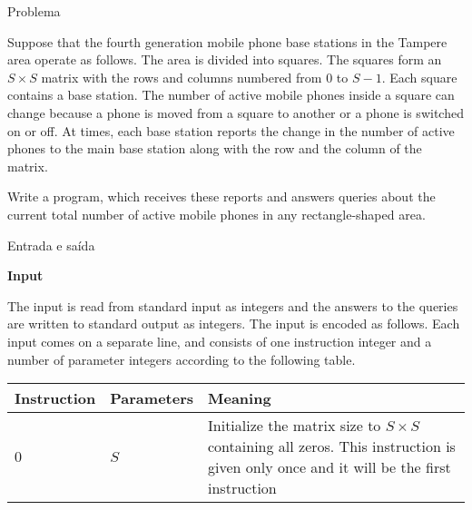 
\begin{frame}[fragile]{Problema}

Suppose that the fourth generation mobile phone base stations in the Tampere area operate as 
follows. The area is divided into squares. The squares form an $S \times S$ matrix with the rows 
and columns numbered from $0$ to $S-1$. Each square contains a base station. The number of active 
mobile phones inside a square can change because a phone is moved from a square to another or a 
phone is switched on or off. At times, each base station reports the change in the number of 
active phones to the main base station along with the row and the column of the matrix. 

Write a program, which receives these reports and answers queries about the current total number 
of active mobile phones in any rectangle-shaped area. 

\end{frame}

\begin{frame}[fragile]{Entrada e saída}

\textbf{Input}

The input is read from standard input as integers and the answers to the queries are written to standard output as integers. The input is encoded as follows. Each input comes on a separate line, and consists of one instruction integer and a number of parameter integers according to the following table. 

\begin{tabularx}{0.95\textwidth}{llX}
    \toprule
    \textbf{Instruction} & \textbf{Parameters} & \textbf{Meaning} \\
    \midrule
    $0$ & $S$ & Initialize the matrix size to $S\times S$ containing all zeros. This instruction
        is given only once and it will be the first instruction \\
    \bottomrule
\end{tabularx}

\end{frame}

